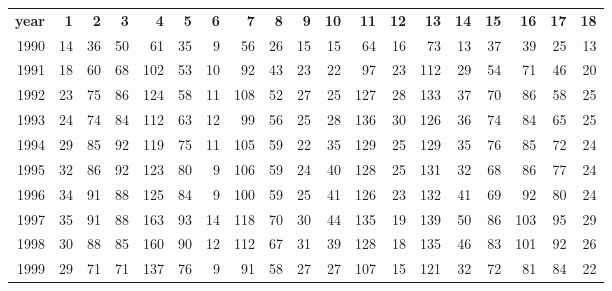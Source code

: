 \begin{tabular}{rrrrrrrrrrrrrrrrrrr}
  \hline
  \textbf{year} & \textbf{ 1} & \textbf{ 2} & \textbf{ 3} & \textbf{ 4} & \textbf{ 5} & \textbf{ 6} & \textbf{ 7} & \textbf{ 8} & \textbf{ 9} & \textbf{ 10} & \textbf{ 11} & \textbf{ 12} & \textbf{ 13} & \textbf{ 14} & \textbf{ 15} & \textbf{ 16} & \textbf{ 17} & \textbf{ 18} \\
  1990 & 14 & 36 & 50 & 61 & 35 & 9 & 56 & 26 & 15 & 15 & 64 & 16 & 73 & 13 & 37 & 39 & 25 & 13 \\
  1991 & 18 & 60 & 68 & 102 & 53 & 10 & 92 & 43 & 23 & 22 & 97 & 23 & 112 & 29 & 54 & 71 & 46 & 20 \\
  1992 & 23 & 75 & 86 & 124 & 58 & 11 & 108 & 52 & 27 & 25 & 127 & 28 & 133 & 37 & 70 & 86 & 58 & 25 \\
  1993 & 24 & 74 & 84 & 112 & 63 & 12 & 99 & 56 & 25 & 28 & 136 & 30 & 126 & 36 & 74 & 84 & 65 & 25 \\
  1994 & 29 & 85 & 92 & 119 & 75 & 11 & 105 & 59 & 22 & 35 & 129 & 25 & 129 & 35 & 76 & 85 & 72 & 24 \\
  1995 & 32 & 86 & 92 & 123 & 80 & 9 & 106 & 59 & 24 & 40 & 128 & 25 & 131 & 32 & 68 & 86 & 77 & 24 \\
  1996 & 34 & 91 & 88 & 125 & 84 & 9 & 100 & 59 & 25 & 41 & 126 & 23 & 132 & 41 & 69 & 92 & 80 & 24 \\
  1997 & 35 & 91 & 88 & 163 & 93 & 14 & 118 & 70 & 30 & 44 & 135 & 19 & 139 & 50 & 86 & 103 & 95 & 29 \\
  1998 & 30 & 88 & 85 & 160 & 90 & 12 & 112 & 67 & 31 & 39 & 128 & 18 & 135 & 46 & 83 & 101 & 92 & 26 \\
  1999 & 29 & 71 & 71 & 137 & 76 & 9 & 91 & 58 & 27 & 27 & 107 & 15 & 121 & 32 & 72 & 81 & 84 & 22 \\\hline
\end{tabular}
